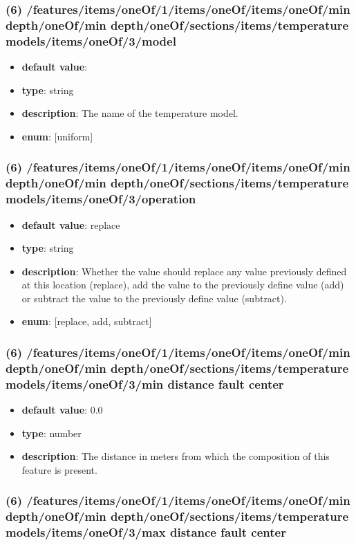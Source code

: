\subsubsection{(6) /features/items/oneOf/1/items/oneOf/items/oneOf/min depth/oneOf/min depth/oneOf/sections/items/temperature models/items/oneOf/3/model}
\begin{itemize}[leftmargin=6em]\item {\bf default value}: 
\item {\bf type}: string
\item {\bf description}: The name of the temperature model.
\item {\bf enum}: [uniform]\end{itemize}\subsubsection{(6) /features/items/oneOf/1/items/oneOf/items/oneOf/min depth/oneOf/min depth/oneOf/sections/items/temperature models/items/oneOf/3/operation}
\begin{itemize}[leftmargin=6em]\item {\bf default value}: replace
\item {\bf type}: string
\item {\bf description}: Whether the value should replace any value previously defined at this location (replace), add the value to the previously define value (add) or subtract the value to the previously define value (subtract).
\item {\bf enum}: [replace, add, subtract]\end{itemize}\subsubsection{(6) /features/items/oneOf/1/items/oneOf/items/oneOf/min depth/oneOf/min depth/oneOf/sections/items/temperature models/items/oneOf/3/min distance fault center}
\begin{itemize}[leftmargin=6em]\item {\bf default value}: 0.0
\item {\bf type}: number
\item {\bf description}: The distance in meters from which the composition of this feature is present.
\end{itemize}\subsubsection{(6) /features/items/oneOf/1/items/oneOf/items/oneOf/min depth/oneOf/min depth/oneOf/sections/items/temperature models/items/oneOf/3/max distance fault center}
